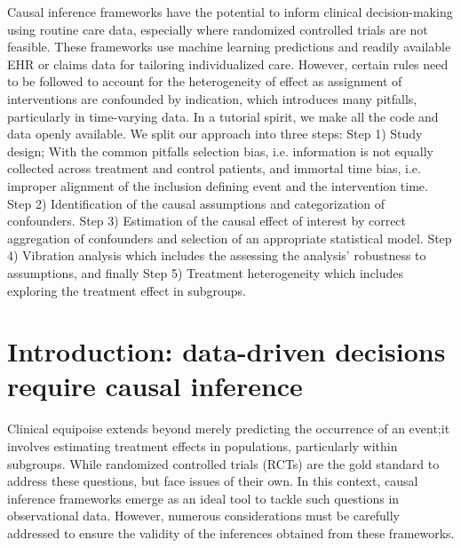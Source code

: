 \documentclass[10pt,letterpaper]{article}
\begin{document}
Causal inference frameworks have the potential to inform clinical
decision-making using routine care data, especially where randomized controlled
trials are not feasible. These frameworks use machine learning predictions and
readily available EHR or claims data for tailoring individualized care. However,
certain rules need to be followed to account for the heterogeneity of effect as
assignment of interventions are confounded by indication, which introduces many
pitfalls, particularly in time-varying data. In a tutorial spirit, we make all
the code and data openly available. We split our approach into three steps: Step
1) Study design; With the common pitfalls selection bias, i.e. information is
not equally collected across treatment and control patients, and immortal time
bias, i.e. improper alignment of the inclusion defining event and the
intervention time. Step 2) Identification of the causal assumptions and
categorization of confounders. Step 3) Estimation of the causal effect of
interest by correct aggregation of confounders and selection of an appropriate
statistical model. Step 4) Vibration analysis which includes the assessing the
analysis' robustness to assumptions, and finally Step 5) Treatment heterogeneity
which includes exploring the treatment effect in subgroups.


\linenumbers

\section*{Introduction: data-driven decisions require causal inference}

Clinical equipoise extends beyond merely predicting the occurrence of an event;it involves estimating treatment effects in populations, particularly within subgroups. While randomized controlled trials (RCTs) are the gold standard to address these questions, but face issues of their own. In this context, causal inference frameworks emerge as an ideal tool to tackle such questions in observational data. However, numerous considerations must be carefully addressed to ensure the validity of the inferences obtained from these frameworks.
\end{document}

